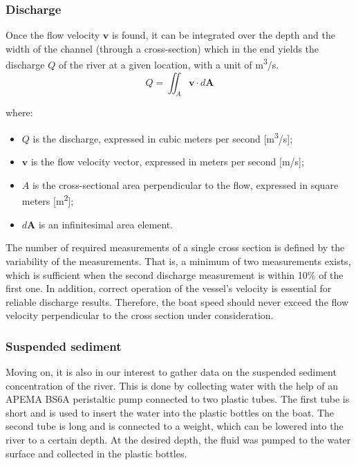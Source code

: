 \subsubsection{Discharge}
Once the flow velocity \(\mathbf{v}\) is found, it can be integrated over the depth and the width of the channel (through a cross-section) which in the end yields the discharge \(Q\) of the river at a given location, with a unit of \si{\cubic\metre}/s.
\begin{equation}
    Q = \iint_A \mathbf{v} \cdot d\mathbf{A}
    \label{eq:discharge_integration}
\end{equation}

\noindent where:
\begin{itemize}
    \item \(Q\) is the discharge, expressed in cubic meters per second [m\textsuperscript{3}/s];
    \item \(\mathbf{v}\) is the flow velocity vector, expressed in meters per second [m/s];
    \item \(A\) is the cross-sectional area perpendicular to the flow, expressed in square meters [m\textsuperscript{2}];
    \item \(d\mathbf{A}\) is an infinitesimal area element.
\end{itemize}

The number of required measurements of a single cross section is defined by the variability of the measurements. That is, a minimum of two measurements exists, which is sufficient when the second discharge measurement is within 10\% of the first one. In addition, correct operation of the vessel's velocity is essential for reliable discharge results. Therefore, the boat speed should never exceed the flow velocity perpendicular to the cross section under consideration. 






\subsubsection{Suspended sediment}
Moving on, it is also in our interest to gather data on the suspended sediment concentration of the river. This is done by collecting water with the help of an APEMA BS6A peristaltic pump connected to two plastic tubes. The first tube is short and is used to insert the water into the plastic bottles on the boat. The second tube is long and is connected to a weight, which can be lowered into the river to a certain depth. At the desired depth, the fluid was pumped to the water surface and collected in the plastic bottles.

